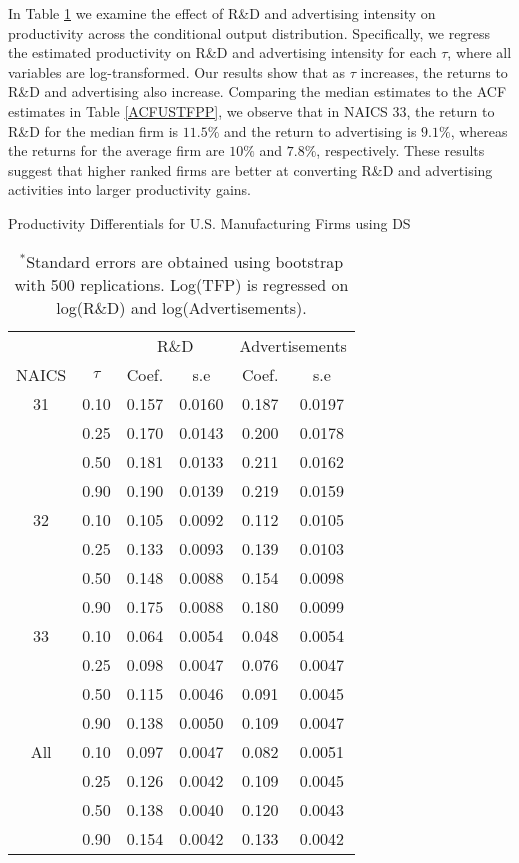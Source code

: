 \documentclass[12pt]{article}
\begin{document}
In Table \ref{QACFUSTFPP} we examine the effect of R\&D and advertising intensity on productivity across the conditional output distribution. Specifically, we regress the estimated productivity on R\&D and advertising intensity for each $\tau$, where all variables are log-transformed. Our results show that as $\tau$ increases, the returns to R\&D and advertising also increase. Comparing the median estimates to the ACF estimates in Table \ref{ACFUSTFPP}, we observe that in NAICS 33, the return to R\&D for the median firm is $11.5\%$ and the return to advertising is $9.1\%$, whereas the returns for the average firm are $10\%$ and $7.8\%$, respectively. These results suggest that higher ranked firms are better at converting R\&D and advertising activities into larger productivity gains. 

\begin{table}[H]
\centering
\caption{Productivity Differentials for U.S. Manufacturing Firms using DS}
\small
\begin{tabular}{cccccc}
  \hline\hline & & \multicolumn{2}{c}{R\&D}  & \multicolumn{2}{c}{Advertisements} \\ \cmidrule(lr){3-4} \cmidrule(lr){5-6}NAICS & $\tau$ & Coef. & s.e & Coef. & s.e \\ 
  \hline
31 & 0.10 & 0.157 & 0.0160 & 0.187 & 0.0197 \\ 
   & 0.25 & 0.170 & 0.0143 & 0.200 & 0.0178 \\ 
   & 0.50 & 0.181 & 0.0133 & 0.211 & 0.0162 \\ 
   & 0.90 & 0.190 & 0.0139 & 0.219 & 0.0159 \\ 
  32 & 0.10 & 0.105 & 0.0092 & 0.112 & 0.0105 \\ 
   & 0.25 & 0.133 & 0.0093 & 0.139 & 0.0103 \\ 
   & 0.50 & 0.148 & 0.0088 & 0.154 & 0.0098 \\ 
   & 0.90 & 0.175 & 0.0088 & 0.180 & 0.0099 \\ 
  33 & 0.10 & 0.064 & 0.0054 & 0.048 & 0.0054 \\ 
   & 0.25 & 0.098 & 0.0047 & 0.076 & 0.0047 \\ 
   & 0.50 & 0.115 & 0.0046 & 0.091 & 0.0045 \\ 
   & 0.90 & 0.138 & 0.0050 & 0.109 & 0.0047 \\ 
  All & 0.10 & 0.097 & 0.0047 & 0.082 & 0.0051 \\ 
   & 0.25 & 0.126 & 0.0042 & 0.109 & 0.0045 \\ 
   & 0.50 & 0.138 & 0.0040 & 0.120 & 0.0043 \\ 
   & 0.90 & 0.154 & 0.0042 & 0.133 & 0.0042 \\ 
   \hline
\end{tabular}
\caption*{\footnotesize $^{*}$Standard errors are obtained using bootstrap with 500 replications. Log(TFP) is regressed on log(R\&D) and log(Advertisements).}
\label{QACFUSTFPP}
\end{table}
\end{document}
